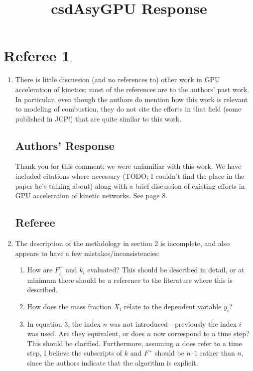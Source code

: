 \documentclass[12pt]{article}
\title{csdAsyGPU Response}
\begin{document}
\maketitle
\section*{Referee 1}
\begin{enumerate}
\subsection*{Referee}
\item  There is little discussion (and no references to) other work in GPU acceleration
of kinetics; most of the references are to the authors’ past work. In particular,
even though the authors do mention how this work is relevant to modeling of
combustion, they do not cite the efforts in that field (some published in JCP!)
that are quite similar to this work.

\subsection*{Authors' Response}
Thank you for this comment; we were unfamiliar with this work.  We have included citations
where necessary (TODO; I couldn't find the place in the paper he's talking about) along with 
a brief discussion of existing efforts in GPU acceleration of kinetic networks.  See page 8.

\subsection*{Referee}
\item  The description of the methdology in section 2 is incomplete, and also appears
to have a few mistakes/inconsistencies:
  \begin{enumerate}
    \item How are $F_{i}^{+}$ and $k_{i}$ evaluated? This should be described in detail, or at
    minimum there should be a reference to the literature where this is
    described.
    \item How does the mass fraction $X_{i}$ relate to the dependent variable $y_{i}$?
    \item In equation 3, the index $n$ was not introduced—previously the index $i$ was
    used. Are they equivalent, or does $n$ now correspond to a time step? This
    should be clarified. Furthermore, assuming $n$ does refer to a time step, I
    believe the subscripts of $k$ and $F^{+}$  should be $n–1$ rather than $n$, since
    the authors indicate that the algorithm is explicit.
  \end{enumerate}


\end{enumerate}
\end{document}
